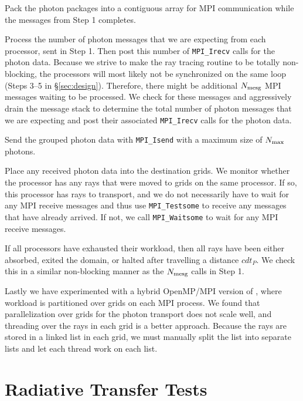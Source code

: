 \documentclass[useAMS,usenatbib,a4paper]{mn2e}
\begin{document}
 Pack the photon packages into a contiguous array for MPI
communication while the messages from Step 1 completes.

 Process the number of photon messages that we are expecting
from each processor, sent in Step 1.  Then post this number of
\texttt{MPI\_Irecv} calls for the photon data.  Because we strive to
make the ray tracing routine to be totally non-blocking, the
processors will most likely not be synchronized on the same loop
(Steps 3--5 in \S\ref{sec:design}).  Therefore, there might be
additional $N_{\rm mesg}$ MPI messages waiting to be processed.  We
check for these messages and aggressively drain the message stack to
determine the total number of photon messages that we are expecting
and post their associated \texttt{MPI\_Irecv} calls for the photon
data.

 Send the grouped photon data with \texttt{MPI\_Isend} with a
maximum size of $N_{\rm max}$ photons.

 Place any received photon data into the destination grids.
We monitor whether the processor has any rays that were moved to grids
on the same processor.  If so, this processor has rays to transport,
and we do not necessarily have to wait for any MPI receive messages
and thus use \texttt{MPI\_Testsome} to receive any messages that have
already arrived.  If not, we call \texttt{MPI\_Waitsome} to wait for
any MPI receive messages.

 If all processors have exhausted their workload, then all
rays have been either absorbed, exited the domain, or halted after
travelling a distance $cdt_P$.  We check this in a similar
non-blocking manner as the $N_{\rm mesg}$ calls in Step 1.

Lastly we have experimented with a hybrid OpenMP/MPI version of \enzo,
where workload is partitioned over grids on each MPI process.  We
found that parallelization over grids for the photon transport does
not scale well, and threading over the rays in each grid is a better
approach.  Because the rays are stored in a linked list in each grid,
we must manually split the list into separate lists and let each
thread work on each list.

\section{Radiative Transfer Tests}
\label{sec:rt_tests}
\end{document}
